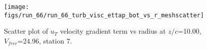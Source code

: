 \begin{figure}[H]
\centering
\texttt{[image: figs/run\_66/run\_66\_turb\_visc\_ettap\_bot\_vs\_r\_meshscatter]}
\caption{Scatter plot of $
u_T$ velocity gradient term vs radius at $z/c$=10.00, $V_{free}$=24.96, station 7.}
\end{figure}


